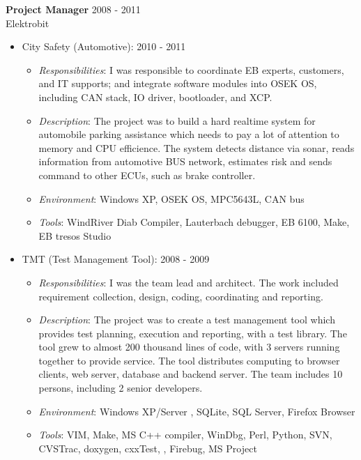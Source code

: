 \textbf{Project Manager} \hfill 2008 - 2011\\
        Elektrobit
        \begin{itemize}  \itemsep -2pt %
            \item City Safety (Automotive): 2010 - 2011
                \begin{itemize} 
                    \item {\em Responsibilities}:
                    I was responsible to coordinate EB experts, customers, and IT supports;
                    and integrate software modules into OSEK OS,
                    including CAN stack, IO driver, bootloader, and XCP.
                    \item {\em Description}:
                    The project was to build a hard realtime system
                    for automobile parking assistance
                    which needs to pay a lot of attention to memory and CPU efficience.
                    The system detects distance via sonar, reads information from automotive BUS network,
                    estimates risk and sends command to other ECUs, such as brake controller.
                    \item {\em Environment}:
                    Windows XP, OSEK OS, MPC5643L, CAN bus
                    \item {\em Tools}:
                    WindRiver Diab Compiler, Lauterbach debugger, EB 6100, Make, EB tresos Studio
                \end{itemize}
            \item TMT (Test Management Tool): 2008 - 2009
                \begin{itemize} 
                    \item {\em Responsibilities}:
                    I was the team lead and architect.
                    The work included requirement collection, design, coding, coordinating and reporting.
                    \item {\em Description}:
                    The project was to create a test management tool
                    which provides test planning, execution and reporting, with a test library.
                    The tool grew to almost 200 thousand lines of code,
                    with 3 servers running together to provide service.
                    The tool distributes computing to browser clients, web server, database and backend server.
                    The team includes 10 persons, including 2 senior developers.
                    \item {\em Environment}:
                    Windows XP/Server , SQLite, SQL Server, Firefox Browser
                    \item {\em Tools}:
                    VIM, Make, MS C++ compiler, WinDbg, Perl, Python, SVN, CVSTrac, doxygen, cxxTest, , Firebug, MS Project
                \end{itemize}
        \end{itemize}
 
